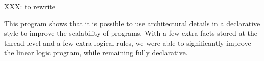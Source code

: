 
XXX: to rewrite

This program shows that it is possible to use architectural details in a
declarative style to improve the scalability of programs. With a few extra
facts stored at the thread level and a few extra logical rules, we were able to
significantly improve the linear logic program, while remaining fully
declarative.


